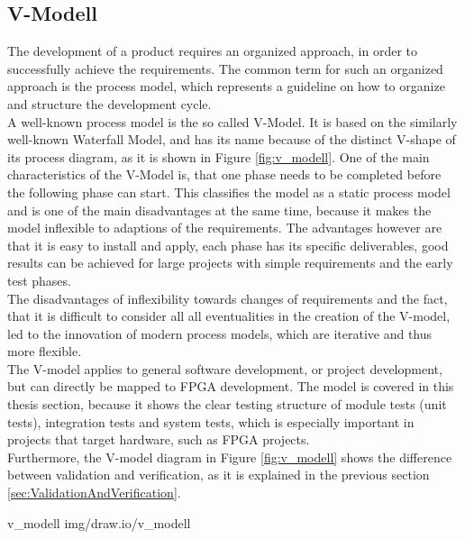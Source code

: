 \subsection{V-Modell}

The development of a product requires an organized approach, in order to successfully achieve the requirements.
The common term for such an organized approach is the process model, which represents a guideline on how to organize and structure the development cycle.\\

A well-known process model is the so called V-Model.
It is based on the similarly well-known Waterfall Model, and has its name because of the distinct V-shape of its process diagram, as it is shown in Figure \ref{fig:v_modell}.
One of the main characteristics of the V-Model is, that one phase needs to be completed before the following phase can start.
This classifies the model as a static process model and is one of the main disadvantages at the same time, because it makes the model inflexible to adaptions of the requirements.
The advantages however are that it is easy to install and apply, each phase has its specific deliverables, good results can be achieved for large projects with simple requirements and the early test phases.\\

The disadvantages of inflexibility towards changes of requirements and the fact, that it is difficult to consider all all eventualities in the creation of the V-model, led to the innovation of modern process models, which are iterative and thus more flexible.\\

The V-model applies to general software development, or project development, but can directly be mapped to FPGA development.
The model is covered in this thesis section, because it shows the clear testing structure of module tests (unit tests), integration tests and system tests, which is especially important in projects that target hardware, such as FPGA projects.\\

Furthermore, the V-model diagram in Figure \ref{fig:v_modell} shows the difference between validation and verification, as it is explained in the previous section \ref{sec:ValidationAndVerification}.

 {v_modell} {img/draw.io/v_modell}

